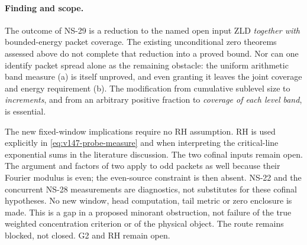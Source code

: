 \paragraph{Finding and scope.}
The outcome of NS-29 is a reduction to the named open input ZLD
\emph{together with} bounded-energy packet coverage. The existing
unconditional zero theorems assessed above do not complete that reduction
into a proved bound. Nor can one identify packet spread alone as the
remaining obstacle: the uniform arithmetic band measure (a) is itself
unproved, and even granting it leaves the joint coverage and energy
requirement (b). The modification from cumulative sublevel size to
\emph{increments}, and from an arbitrary positive fraction to
\emph{coverage of each level band}, is essential.

The new fixed-window implications require no RH assumption. RH is used
explicitly in \eqref{eq:v147-probe-measure} and when interpreting the
critical-line exponential sums in the literature discussion. The two cofinal
inputs remain open. The argument and factors of two apply to odd
packets as well because their Fourier modulus is even; the even-source
constraint is then absent. NS-22 and the concurrent NS-28 measurements
are diagnostics, not substitutes for these cofinal hypotheses. No new
window, head computation, tail metric or zero enclosure is made. This
is a gap in a proposed minorant obstruction, not failure of the true
weighted concentration criterion or of the physical object. The route
remains blocked, not closed. G2 and RH remain open.


